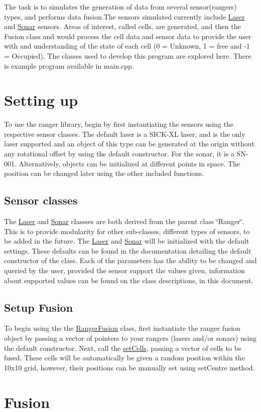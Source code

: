 The task is to simulates the generation of data from several sensor(rangers) types, and performs data fusion.\+The sensors simulated currently include \hyperlink{classLaser}{Laser} and \hyperlink{classSonar}{Sonar} sensors. Areas of interest, called cells, are generated, and then the Fusion class and would process the cell data and sensor data to provide the user with and understanding of the state of each cell (0 = Unknown, 1 = free and -\/1 = Occupied). The classes used to develop this program are explored here. There is example program available in main.\+cpp.\hypertarget{index_ac_doc_index_more_info}{}\section{Setting up}\label{index_ac_doc_index_more_info}
To use the ranger library, begin by first instantiating the sensors using the respective sensor classes. The default laser is a S\+I\+C\+K-\/\+XL laser, and is the only laser supported and an object of this type can be generated at the origin without any rotational offset by using the default constructor. For the sonar, it is a S\+N-\/001. Alternatively, objects can be initialized at different points in space. The position can be changed later using the other included functions.\hypertarget{index_ac_doc_sensor_classes}{}\subsection{Sensor classes}\label{index_ac_doc_sensor_classes}
The \hyperlink{classLaser}{Laser} and \hyperlink{classSonar}{Sonar} classses are both derived from the parent class \char`\"{}\+Ranger\char`\"{}. This is to provide modularity for other sub-\/classes, different types of sensors, to be added in the future. The \hyperlink{classLaser}{Laser} and \hyperlink{classSonar}{Sonar} will be initialized with the default settings. These defaults can be found in the documentation detailing the default constructor of the class. Each of the parameters has the ability to be changed and queried by the user, provided the sensor support the values given, information about supported values can be found on the class descriptions, in this document.\hypertarget{index_ac_doc_setup_fusion}{}\subsection{Setup Fusion}\label{index_ac_doc_setup_fusion}
To begin using the the \hyperlink{classRangerFusion}{Ranger\+Fusion} class, first instantiate the ranger fusion object by passing a vector of pointers to your rangers (lasers and/or sonars) using the default constructor. Next, call the \hyperlink{classRangerFusion_a9b69869bd1e3bca155bcecbad5ea463b}{set\+Cells}, passing a vector of cells to be fused. These cells will be automatically be given a random position within the 10x10 grid, however, their positions can be manually set using set\+Centre method.\hypertarget{index_ac_doc_fusion}{}\section{Fusion}\label{index_ac_doc_fusion}
